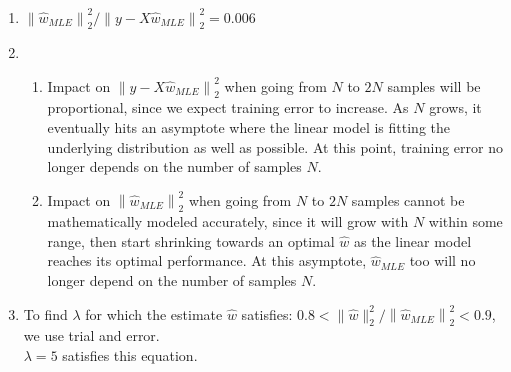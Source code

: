 \begin{enumerate}
    \begin{enumerate}
        \item $\left\|\widehat{w}_{M L E}\right\|_{2}^{2} /\left\|y-X \widehat{w}_{M L E}\right\|_{2}^{2} = 0.006$
        \item \begin{enumerate}
        	\item Impact on $\left\|y-X \widehat{w}_{M L E}\right\|_{2}^{2}$ when going from $N$ to $2N$ samples will be proportional, since we expect training error to increase. As $N$ grows, it eventually hits an asymptote where the linear model is fitting the underlying distribution as well as possible. At this point, training error no longer depends on the number of samples $N$.
        	\item Impact on $\left\|\widehat{w}_{M L E}\right\|_{2}^{2}$ when going from $N$ to $2N$ samples cannot be mathematically modeled accurately, since it will grow with $N$ within some range, then start shrinking towards an optimal $\widehat{w}$ as the linear model reaches its optimal performance. At this asymptote, $\widehat{w}_{M L E}$ too will no longer depend on the number of samples $N$.
        \end{enumerate}
    \item To find $\lambda$ for which the estimate $\widehat{w}$ satisfies: $0.8<\|\widehat{w}\|_{2}^{2} /\left\|\widehat{w}_{M L E}\right\|_{2}^{2}<0.9$, we use trial and error. \\
    $\lambda = 5$ satisfies this equation.
    \end{enumerate}
\end{enumerate}